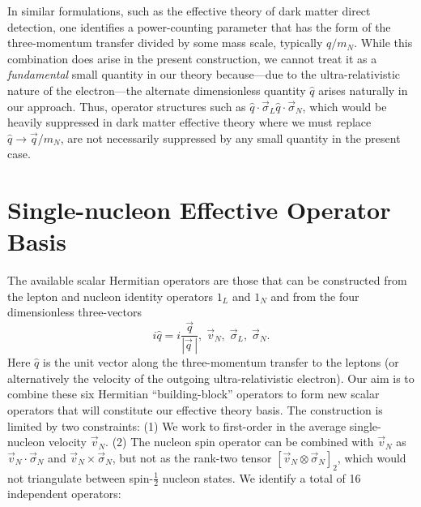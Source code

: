 \documentclass[12pt,letterpaper]{book}
\begin{document}
In similar formulations, such as the effective theory of dark matter direct detection, one identifies a power-counting parameter that has the form of the three-momentum transfer divided by some mass scale, typically $q/m_N$. While this combination does arise in the present construction, we cannot treat it as a \textit{fundamental} small quantity in our theory because---due to the ultra-relativistic nature of the electron---the alternate dimensionless quantity $\hat{q}$ arises naturally in our approach. Thus, operator structures such as $\hat{q}\cdot\vec{\sigma}_L\hat{q}\cdot\vec{\sigma}_N$, which would be heavily suppressed in dark matter effective theory where we must replace $\hat{q}\rightarrow \vec{q}/m_N$, are not necessarily suppressed by any small quantity in the present case.


\section{Single-nucleon Effective Operator Basis}
The available scalar Hermitian operators are those that can be constructed from the lepton and nucleon identity operators $1_L$ and $1_N$ and from the four dimensionless three-vectors
\begin{equation}
i\hat{q}=i\frac{\vec{q}}{|\vec{q}\,|},\;\vec{v}_N,\;\vec{\sigma}_L,\;\vec{\sigma}_N.
\end{equation}
Here $\hat{q}$ is the unit vector along the three-momentum transfer to the leptons (or alternatively the velocity of the outgoing ultra-relativistic electron). Our aim is to combine these six Hermitian ``building-block'' operators to form new scalar operators that will constitute our effective theory basis. The construction is limited by two constraints: (1) We work to first-order in the average single-nucleon velocity $\vec{v}_N$. (2) The nucleon spin operator can be combined with $\vec{v}_N$ as $\vec{v}_N\cdot\vec{\sigma}_N$ and $\vec{v}_N\times\vec{\sigma}_N$, but not as the rank-two tensor $\left[\vec{v}_N\otimes\vec{\sigma}_N\right]_2$, which would not triangulate between spin-$\frac{1}{2}$ nucleon states.  We identify a total of 16 independent operators:
\end{document}

